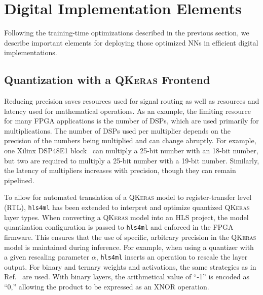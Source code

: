 \documentclass[sigconf]{acmart}
\newcommand{\hlsfml}{\texttt{hls4ml}\xspace}
\begin{document}

\section{Digital Implementation Elements}
\label{sec:impl}

Following the training-time optimizations described in the previous section, we describe important elements for deploying those optimized NNs in efficient digital implementations. 

\subsection{Quantization with a \textsc{QKeras} Frontend}

Reducing precision saves resources used for signal routing as well as resources and latency used for mathematical operations.
As an example, the limiting resource for many FPGA applications is the number of DSPs, which are used primarily for multiplications.
The number of DSPs used per multiplier depends on the precision of the numbers being multiplied and can change abruptly.  
For example, one Xilinx DSP48E1 block~\cite{dsp48e1} can multiply a 25-bit number with an 18-bit number, 
but two are required to multiply a 25-bit number with a 19-bit number.  
Similarly, the latency of multipliers increases with precision, though they can remain pipelined.

To allow for automated translation of a \textsc{QKeras} model to register-transfer level (RTL), \hlsfml has been extended to interpret and optimize quantized \textsc{QKeras} layer types. 
When converting a \textsc{QKeras} model into an HLS project, the model quantization configuration is passed to \hlsfml and enforced in the FPGA firmware.
This ensures that the use of specific, arbitrary precision in the \textsc{QKeras} model is maintained during inference.
For example, when using a quantizer with a given rescaling parameter $\alpha$, \hlsfml inserts an operation to rescale the layer output.
For binary and ternary weights and activations, the same strategies as in Ref.~\cite{DiGuglielmo:2020eqx} are used.
With binary layers, the  arithmetical value of ``-1'' is encoded as ``0,'' allowing the product to be expressed as an XNOR operation.
\end{document}
